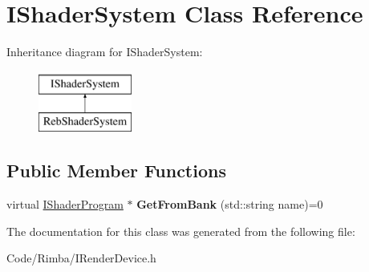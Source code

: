 \hypertarget{class_i_shader_system}{}\section{I\+Shader\+System Class Reference}
\label{class_i_shader_system}
Inheritance diagram for I\+Shader\+System\+:\begin{figure}[H]
\begin{center}
\leavevmode
\includegraphics[height=2.000000cm]{class_i_shader_system}
\end{center}
\end{figure}
\subsection*{Public Member Functions}
\begin{DoxyCompactItemize}
\item 
virtual \hyperlink{class_i_shader_program}{I\+Shader\+Program} $\ast$ {\bfseries Get\+From\+Bank} (std\+::string name)=0\hypertarget{class_i_shader_system_a960e368e2c8f52da5b9d65ea983902ec}{}\label{class_i_shader_system_a960e368e2c8f52da5b9d65ea983902ec}

\end{DoxyCompactItemize}


The documentation for this class was generated from the following file\+:\begin{DoxyCompactItemize}
\item 
Code/\+Rimba/I\+Render\+Device.\+h\end{DoxyCompactItemize}
